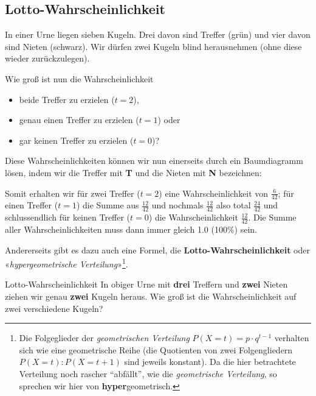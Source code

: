 
\newpage

\subsection{Lotto-Wahrscheinlichkeit}
In einer Urne liegen sieben Kugeln. Drei davon sind Treffer (grün) und vier davon sind Nieten (schwarz).
Wir dürfen zwei Kugeln blind herausnehmen (ohne diese wieder zurückzulegen).


Wie groß ist nun die Wahrscheinlichkeit
\begin{itemize}
\item beide Treffer zu erzielen ($t=2$),
\item genau einen Treffer zu erzielen ($t=1$) oder
\item gar keinen Treffer zu erzielen ($t=0$)?
\end{itemize}

Diese Wahrscheinlichkeiten können wir nun einerseits durch ein Baumdiagramm lösen, indem wir die Treffer mit \textbf{\color{green}T} und die Nieten mit \textbf{\color{red}N} bezeichnen:


Somit erhalten wir für zwei Treffer ($t=2$) eine Wahrscheinlichkeit von $\frac{6}{42}$; für einen Treffer ($t=1$) die Summe aus $\frac{12}{42}$ und nochmals $\frac{12}{42}$ also total $\frac{24}{42}$ und schlussendlich für keinen Treffer ($t=0$) die Wahrscheinlichkeit $\frac{12}{42}$.
Die Summe aller Wahrscheinlichkeiten muss dann immer gleich 1.0 (100\%) sein.
\newpage

Andererseits gibt es dazu auch eine Formel, die
\textbf{Lotto-Wahrscheinlichkeit} oder «\textit{hypergeometrische
  Verteilung}»\footnote{Die Folgeglieder der \textit{geometrischen
    Verteilung} $P(X=t) = p\cdot{}q^{t-1}$ verhalten sich wie eine
  geometrische Reihe (die Quotienten von zwei Folgengliedern $P(X=t) :
  P(X=t+1)$ sind jeweils konstant). Da die hier betrachtete Verteilung
  noch rascher ``abfällt'', wie die \textit{geometrische Verteilung},
  so sprechen wir hier von \textbf{hyper}geometrisch.}.

\begin{beispiel}{Lotto-Wahrscheinlichkeit}{}
  In obiger Urne mit \textbf{drei} Treffern und \textbf{zwei} Nieten
  ziehen wir genau \textbf{zwei} Kugeln heraus. Wie groß ist die
  Wahrscheinlichkeit auf zwei verschiedene Kugeln?
\end{beispiel}



